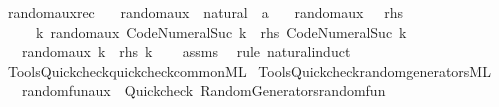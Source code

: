 \begin{isabellebody}
\ random{\isacharunderscore}{\kern0pt}aux{\isacharunderscore}{\kern0pt}rec{\isacharcolon}{\kern0pt}\isanewline
\ \ \ random{\isacharunderscore}{\kern0pt}aux\ {\isacharcolon}{\kern0pt}{\isacharcolon}{\kern0pt}\ {\isachardoublequoteopen}natural\ {\isasymRightarrow}\ {\isacharprime}{\kern0pt}a{\isachardoublequoteclose}\isanewline
\ \ \ {\isachardoublequoteopen}random{\isacharunderscore}{\kern0pt}aux\ {}\ {\isacharequal}{\kern0pt}\ rhs\ {}{\isachardoublequoteclose}\isanewline
\ \ \ \ \ {\isachardoublequoteopen}{\isasymAnd}k{\isachardot}{\kern0pt}\ random{\isacharunderscore}{\kern0pt}aux\ {\isacharparenleft}{\kern0pt}Code{\isacharunderscore}{\kern0pt}Numeral{\isachardot}{\kern0pt}Suc\ k{\isacharparenright}{\kern0pt}\ {\isacharequal}{\kern0pt}\ rhs\ {\isacharparenleft}{\kern0pt}Code{\isacharunderscore}{\kern0pt}Numeral{\isachardot}{\kern0pt}Suc\ k{\isacharparenright}{\kern0pt}{\isachardoublequoteclose}\isanewline
\ \ \ {\isachardoublequoteopen}random{\isacharunderscore}{\kern0pt}aux\ k\ {\isacharequal}{\kern0pt}\ rhs\ k{\isachardoublequoteclose}\isanewline
%
\isadelimproof
\ \ %
\endisadelimproof
%
\isatagproof
{}\isamarkupfalse%
\ assms\ \isamarkupfalse%
\ {\isacharparenleft}{\kern0pt}rule\ natural{\isachardot}{\kern0pt}induct{\isacharparenright}{\kern0pt}%
\endisatagproof
{\isafoldproof}%
%
\isadelimproof
%
\endisadelimproof
%
\isadelimdocument
%
\endisadelimdocument
%
\isatagdocument
%
\isamarkuptrue%
%
\endisatagdocument
{\isafolddocument}%
%
\isadelimdocument
%
\endisadelimdocument
%
\isadelimML
%
\endisadelimML
%
\isatagML
{}\isamarkupfalse%
\ {\isacartoucheopen}Tools{\isacharslash}{\kern0pt}Quickcheck{\isacharslash}{\kern0pt}quickcheck{\isacharunderscore}{\kern0pt}common{\isachardot}{\kern0pt}ML{\isacartoucheclose}\isanewline
{}\isamarkupfalse%
\ {\isacartoucheopen}Tools{\isacharslash}{\kern0pt}Quickcheck{\isacharslash}{\kern0pt}random{\isacharunderscore}{\kern0pt}generators{\isachardot}{\kern0pt}ML{\isacartoucheclose}%
\endisatagML
{\isafoldML}%
%
\isadelimML
%
\endisadelimML
%
\isadelimdocument
%
\endisadelimdocument
%
\isatagdocument
%
\isamarkuptrue%
%
\endisatagdocument
{\isafolddocument}%
%
\isadelimdocument
%
\endisadelimdocument
{}\isamarkupfalse%
\isanewline
\ \ \ random{\isacharunderscore}{\kern0pt}fun{\isacharunderscore}{\kern0pt}aux\ {\isasymrightharpoonup}\ {\isacharparenleft}{\kern0pt}Quickcheck{\isacharparenright}{\kern0pt}\ {\isachardoublequoteopen}Random{\isacharprime}{\kern0pt}{\isacharunderscore}{\kern0pt}Generators{\isachardot}{\kern0pt}random{\isacharprime}{\kern0pt}{\isacharunderscore}{\kern0pt}fun{\isachardoublequoteclose}\isanewline

\end{isabellebody}
